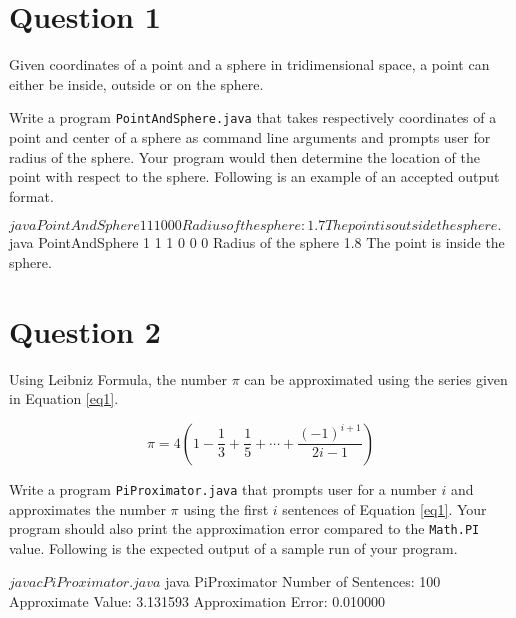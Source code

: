 \documentclass[12pt,letterpaper,twoside]{article}
\begin{document}


\section*{Question 1}

Given coordinates of a point and a sphere in tridimensional space, a point can either be inside, outside or on the sphere.

Write a program \texttt{PointAndSphere.java} that takes respectively coordinates of a point and center of a sphere as command line arguments and prompts user for radius of the sphere.
Your program would then determine the location of the point with respect to the sphere.
Following is an example of an accepted output format.

\begin{terminal}
$ java PointAndSphere 1 1 1 0 0 0
Radius of the sphere: 1.7
The point is outside the sphere.
$ java PointAndSphere 1 1 1 0 0 0
Radius of the sphere 1.8
The point is inside the sphere.
\end{terminal}

\section*{Question 2}

Using Leibniz Formula, the number $\pi$ can be approximated using the series given in Equation \ref{eq1}.

\begin{equation}
\pi = 4 \left( 1 - \frac{1}{3} + \frac{1}{5} + \cdots + \frac{(-1)^{i+1}}{2i-1} \right)
\label{eq1}
\end{equation}

Write a program \texttt{PiProximator.java} that prompts user for a number $i$ and approximates the number $\pi$ using the first $i$ sentences of Equation \ref{eq1}.
Your program should also print the approximation error compared to the \texttt{Math.PI} value.
Following is the expected output of a sample run of your program.

\newpage

\begin{terminal}
$ javac PiProximator.java
$ java PiProximator
Number of Sentences: 100
Approximate Value: 3.131593
Approximation Error: 0.010000
\end{terminal}
\end{document}
